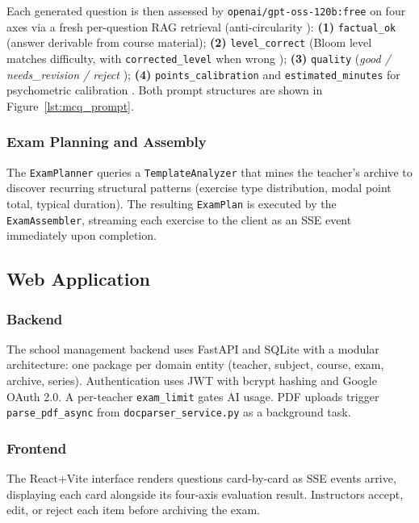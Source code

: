 Each generated question is then assessed by \texttt{openai/gpt-oss-120b:free}
on four axes via a fresh per-question RAG retrieval (anti-circularity
\cite{morris2024aqg}): \textbf{(1)} \texttt{factual\_ok} (answer derivable from
course material); \textbf{(2)} \texttt{level\_correct} (Bloom level matches
difficulty, with \texttt{corrected\_level} when wrong
\cite{meissner2024itemforge}); \textbf{(3)} \texttt{quality}
(\textit{good / needs\_revision / reject} \cite{mucciaccia2025mcq});
\textbf{(4)} \texttt{points\_calibration} and \texttt{estimated\_minutes}
for psychometric calibration \cite{isley2025quality}.
Both prompt structures are shown in Figure~\ref{lst:mcq_prompt}.

\subsubsection{Exam Planning and Assembly}

The \texttt{ExamPlanner} queries a \texttt{TemplateAnalyzer} that mines the teacher's
archive to discover recurring structural patterns (exercise type distribution,
modal point total, typical duration).
The resulting \texttt{ExamPlan} is executed by the \texttt{ExamAssembler}, streaming
each exercise to the client as an SSE event immediately upon completion.

\subsection{Web Application}
\label{subsec:webapp}

\subsubsection{Backend}

The school management backend uses FastAPI \cite{fastapi2019} and SQLite with a
modular architecture: one package per domain entity (teacher, subject, course, exam,
archive, series).
Authentication uses JWT with bcrypt hashing and Google OAuth 2.0.
A per-teacher \texttt{exam\_limit} gates AI usage.
PDF uploads trigger \texttt{parse\_pdf\_async} from \texttt{docparser\_service.py}
as a background task.

\subsubsection{Frontend}

The React+Vite interface renders questions card-by-card as SSE events arrive,
displaying each card alongside its four-axis evaluation result.
Instructors accept, edit, or reject each item before archiving the exam.

